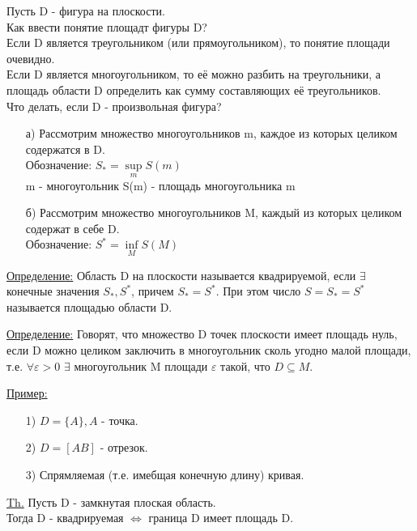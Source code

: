 Пусть D - фигура на плоскости. \\

Как ввести понятие площадт фигуры D? \\

Если D является треугольником (или прямоугольником), то понятие площади очевидно. \\

Если D является многоугольником, то её можно разбить на треугольники, а площадь области D определить как сумму составляющих её треугольников. \\

Что делать, если D - произвольная фигура?

\begin{enumerate}
\item[а)] 
Рассмотрим множество многоугольников m, каждое из которых целиком содержатся в D.\\
Обозначение: $S_* = \sup\limits_{m} S(m)$ \\
m - многоугольник
S(m) - площадь многоугольника m 

\item[б)] 
Рассмотрим множество многоугольников M, каждый из которых целиком содержат в себе D. \\
Обозначение: $S^* = \inf\limits_{M} S(M)$
\end{enumerate}

\underline{Определение:} Область D на плоскости называется квадрируемой, если $\exists$ конечные значения $S_*, S^*$, причем $S_* = S^*$. При этом число $S = S_* = S^*$ называется площадью области D.

\underline{Определение:} Говорят, что множество D точек плоскости имеет площадь нуль, если D можно целиком заключить в многоугольник сколь угодно малой площади, т.е. $\forall \varepsilon > 0$ $\exists$ многоугольник M площади $\varepsilon$ такой, что $D \subseteq M$.


\underline{Пример:}
\begin{enumerate}
\item[1)]
$D = \{A\}, A$ - точка.

\item[2)]
$D = [AB]$ - отрезок.

\item[3)] Спрямляемая (т.е. имебщая конечную длину) кривая.
\end{enumerate}


\underline{Th.}
Пусть D - замкнутая плоская область. \\
Тогда D - квадрируемая $\Leftrightarrow$ граница D имеет площадь D. \\

